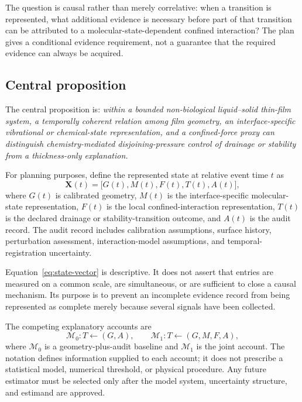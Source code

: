 \documentclass[conference]{IEEEtran}
\begin{document}
The question is causal rather than merely correlative: when a transition is represented, what additional evidence is necessary before part of that transition can be attributed to a molecular-state-dependent confined interaction? The plan gives a conditional evidence requirement, not a guarantee that the required evidence can always be acquired.

\subsection{Central proposition}

The central proposition is: \emph{within a bounded non-biological liquid--solid thin-film system, a temporally coherent relation among film geometry, an interface-specific vibrational or chemical-state representation, and a confined-force proxy can distinguish chemistry-mediated disjoining-pressure control of drainage or stability from a thickness-only explanation.}

For planning purposes, define the represented state at relative event time $t$ as
\begin{equation}
\mathbf{X}(t)=\bigl[G(t),M(t),F(t),T(t),A(t)\bigr],
\label{eq:state-vector}
\end{equation}
where $G(t)$ is calibrated geometry, $M(t)$ is the interface-specific molecular-state representation, $F(t)$ is the local confined-interaction representation, $T(t)$ is the declared drainage or stability-transition outcome, and $A(t)$ is the audit record. The audit record includes calibration assumptions, surface history, perturbation assessment, interaction-model assumptions, and temporal-registration uncertainty.

Equation~\eqref{eq:state-vector} is descriptive. It does not assert that entries are measured on a common scale, are simultaneous, or are sufficient to close a causal mechanism. Its purpose is to prevent an incomplete evidence record from being represented as complete merely because several signals have been collected.

The competing explanatory accounts are
\begin{equation}
\mathcal{M}_{0}:T\leftarrow(G,A),\qquad
\mathcal{M}_{1}:T\leftarrow(G,M,F,A),
\label{eq:model-comparison}
\end{equation}
where $\mathcal{M}_{0}$ is a geometry-plus-audit baseline and $\mathcal{M}_{1}$ is the joint account. The notation defines information supplied to each account; it does not prescribe a statistical model, numerical threshold, or physical procedure. Any future estimator must be selected only after the model system, uncertainty structure, and estimand are approved.
\end{document}
